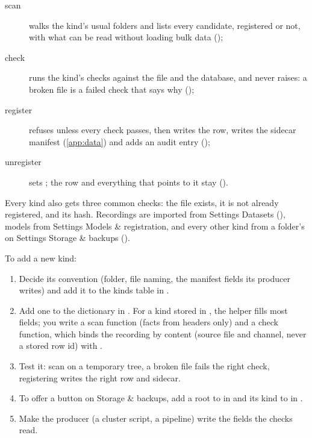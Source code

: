 \begin{description}
\item[scan] walks the kind's usual folders and lists every candidate, registered or not, with what
  can be read without loading bulk data ();
\item[check] runs the kind's checks against the file and the database, and never raises: a broken
  file is a failed check that says why ();
\item[register] refuses unless every check passes, then writes the row, writes the sidecar manifest
  (\cref{app:data}) and adds an audit entry ();
\item[unregister] sets ; the row and everything that points to it stay
  ().
\end{description}
Every kind also gets three common checks: the file exists, it is not already registered, and its
hash. Recordings are imported from Settings \textrightarrow{} Datasets (),
models from Settings \textrightarrow{} Models \& registration, and every other kind from a folder's
 on Settings \textrightarrow{} Storage \& backups ().

To add a new kind:
\begin{enumerate}
\item Decide its convention (folder, file naming, the manifest fields its producer writes) and add
  it to the kinds table in .
\item Add one  to the  dictionary in .
  For a kind stored in , the helper  fills most fields;
  you write a scan function (facts from headers only) and a check function, which binds the
  recording by content (source file and channel, never a stored row id) with
  .
\item Test it: scan on a temporary tree, a broken file fails the right check, registering writes the
  right row and sidecar.
\item To offer a  button on Storage \& backups, add a root to  in
   and its kind to  in
  .
\item Make the producer (a cluster script, a pipeline) write the fields the checks read.
\end{enumerate}

